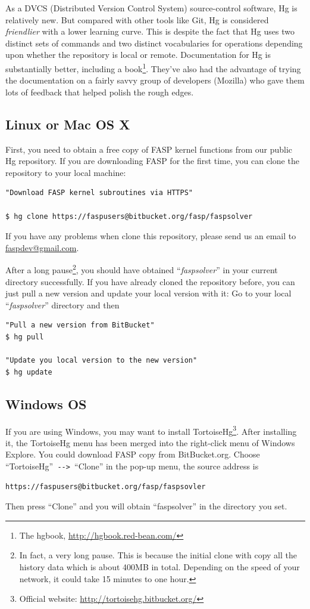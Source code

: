 \documentclass[11pt]{memoir}
\begin{document}
As a DVCS (Distributed Version Control System) source-control
software, Hg is relatively new. But compared with other tools like
Git, Hg is considered \emph{friendlier} with a lower learning
curve. This is despite the fact that Hg uses two distinct sets of
commands and two distinct vocabularies for operations depending upon
whether the repository is local or remote.  Documentation for Hg is
substantially better, including a book\footnote{The hgbook,
  \url{http://hgbook.red-bean.com/}}. They've also had the advantage
of trying the documentation on a fairly savvy group of developers
(Mozilla) who gave them lots of feedback that helped polish the rough
edges.

\subsection{Linux or Mac OS X}
First, you need to obtain a free copy of FASP kernel functions from
our public Hg repository. If you are downloading FASP for the first
time, you can clone the repository to your local machine:
%
\begin{lstlisting}[numbers=none]
"Download FASP kernel subroutines via HTTPS"

$ hg clone https://faspusers@bitbucket.org/fasp/faspsolver
\end{lstlisting}
%
\begin{snugshade}\noindent
If you have any problems when clone this repository, please send us an email to \url{faspdev@gmail.com}.
\end{snugshade}

After a long pause\footnote{In fact, a very long pause. This is
  because the initial clone with copy all the history data which is
  about 400MB in total. Depending on the speed of your network, it
  could take 15 minutes to one hour.}, you should have obtained
``\emph{faspsolver}'' in your current directory successfully. If you
have already cloned the repository before, you can just pull a new
version and update your local version with it: Go to your local
``\emph{faspsolver}'' directory and then
%
\begin{lstlisting}[numbers=none]
"Pull a new version from BitBucket"
$ hg pull

"Update you local version to the new version"
$ hg update
\end{lstlisting}
%

\subsection{Windows OS}
If you are using Windows, you may want to install
TortoiseHg\footnote{Official website:
  \url{http://tortoisehg.bitbucket.org/}}. After installing it, the
TortoiseHg menu has been merged into the right-click menu of Windows
Explore. You could download FASP copy from BitBucket.org. Choose
``TortoiseHg''\verb| --> |``Clone'' in the pop-up menu, the source
address is
\begin{lstlisting}[numbers=none]
https://faspusers@bitbucket.org/fasp/faspsovler
\end{lstlisting}
Then press ``Clone'' and you will obtain ``faspsolver'' in the directory you set.
\end{document}

